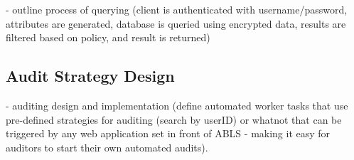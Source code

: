 \documentclass{sig-alternate}
\begin{document}
- outline process of querying (client is authenticated with username/password, attributes are generated, database is queried using encrypted data, results are filtered based on policy, and result is returned)

\subsection{Audit Strategy Design}
- auditing design and implementation (define automated worker tasks that use pre-defined strategies for
auditing (search by userID) or whatnot that can be triggered by any web application set in front of ABLS - 
making it easy for auditors to start their own automated audits). 

\balance
\end{document}
